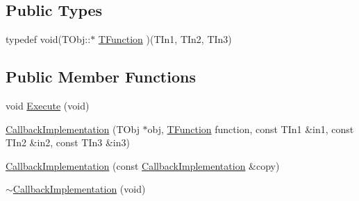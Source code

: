 \subsection*{Public Types}
\begin{DoxyCompactItemize}
\item 
typedef void(T\-Obj\-::$\ast$ \hyperlink{class_callback_implementation_3_01_t_obj_00_01_t_in1_00_01_t_in2_00_01_t_in3_00_01_empty_class_01_4_ae2effc19800057a6d73a828da5f26613}{T\-Function} )(T\-In1, T\-In2, T\-In3)
\end{DoxyCompactItemize}
\subsection*{Public Member Functions}
\begin{DoxyCompactItemize}
\item 
void \hyperlink{class_callback_implementation_3_01_t_obj_00_01_t_in1_00_01_t_in2_00_01_t_in3_00_01_empty_class_01_4_a6e850f09943acb840c037ee2bb781723}{Execute} (void)
\item 
\hyperlink{class_callback_implementation_3_01_t_obj_00_01_t_in1_00_01_t_in2_00_01_t_in3_00_01_empty_class_01_4_a5a097f1bc1bd84a73bab6303cfce0057}{Callback\-Implementation} (T\-Obj $\ast$obj, \hyperlink{class_callback_implementation_3_01_t_obj_00_01_t_in1_00_01_t_in2_00_01_t_in3_00_01_empty_class_01_4_ae2effc19800057a6d73a828da5f26613}{T\-Function} function, const T\-In1 \&in1, const T\-In2 \&in2, const T\-In3 \&in3)
\item 
\hyperlink{class_callback_implementation_3_01_t_obj_00_01_t_in1_00_01_t_in2_00_01_t_in3_00_01_empty_class_01_4_a5253f83098180e90ff1f544050f8de23}{Callback\-Implementation} (const \hyperlink{class_callback_implementation}{Callback\-Implementation} \&copy)
\item 
\hyperlink{class_callback_implementation_3_01_t_obj_00_01_t_in1_00_01_t_in2_00_01_t_in3_00_01_empty_class_01_4_aac8c9b085ef8caa3daecd0a111f28354}{$\sim$\-Callback\-Implementation} (void)
\end{DoxyCompactItemize}
